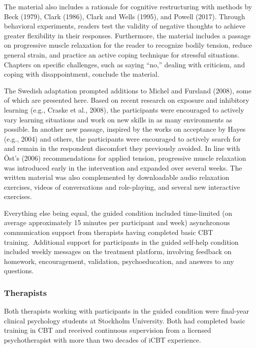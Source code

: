 \documentclass[3p]{elsarticle} %
\begin{document}
The material also includes a rationale for cognitive restructuring with
methods by Beck (1979), Clark (1986), Clark and Wells (1995), and Powell
(2017). Through behavioral experiments, readers test the validity of
negative thoughts to achieve greater flexibility in their responses.
Furthermore, the material includes a passage on progressive muscle
relaxation for the reader to recognize bodily tension, reduce general
strain, and practice an active coping technique for stressful
situations. Chapters on specific challenges, such as saying ``no,''
dealing with criticism, and coping with disappointment, conclude the
material.

The Swedish adaptation prompted additions to Michel and Fursland (2008),
some of which are presented here. Based on recent research on exposure
and inhibitory learning (e.g., Craske et al., 2008), the participants
were encouraged to actively vary learning situations and work on new
skills in as many environments as possible. In another new passage,
inspired by the works on acceptance by Hayes (e.g., 2004) and others,
the participants were encouraged to actively search for and remain in
the respondent discomfort they previously avoided. In line with Öst's
(2006) recommendations for applied tension, progressive muscle
relaxation was introduced early in the intervention and expanded over
several weeks. The written material was also complemented by
downloadable audio relaxation exercises, videos of conversations and
role-playing, and several new interactive exercises.

\color{newtext}Everything else being equal, the guided condition
included time-limited (on average approximately 15 minutes per
participant and week) asynchronous communication support from therapists
having completed basic CBT training.\color{oldtext}~Additional support
for participants in the guided self-help condition included weekly
messages on the treatment platform, involving feedback on homework,
encouragement, validation, psychoeducation, and answers to any
questions.

\hypertarget{therapists}{%
\subsubsection{Therapists}\label{therapists}}

Both therapists working with participants in the guided condition were
final-year clinical psychology students at Stockholm University. Both
had completed basic training in CBT and received continuous supervision
from a licensed psychotherapist with more than two decades of iCBT
experience.
\end{document}
